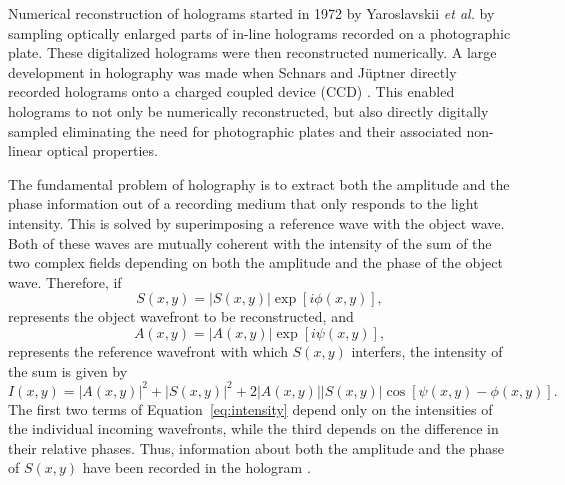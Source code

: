 Numerical reconstruction of holograms started in 1972 by Yaroslavskii
\emph{et al.} 
by sampling optically enlarged parts of in-line
holograms recorded on a photographic plate. These digitalized
holograms were then reconstructed numerically. A large development in
holography was made when Schnars and J\"{u}ptner directly recorded holograms
onto a charged coupled device (CCD) \cite{schnars_digital_2002}.
This enabled holograms to not only
be numerically reconstructed, but also directly digitally sampled
eliminating the need for
photographic plates and their associated non-linear optical properties.

The fundamental problem of holography is 
to extract
both the amplitude and the phase information out of
a recording medium that only responds to the light intensity. 
This is solved by superimposing a reference wave with the object wave. Both of
these waves are mutually coherent with the intensity of the sum of the two
complex fields depending on both the amplitude and the phase of the object
wave. Therefore, if
\begin{equation}
    S(x,y) = \left| S(x,y) \right | \exp{[i\phi(x,y)]} ,
\end{equation}
represents the object wavefront to be reconstructed, and
\begin{equation}
    A(x,y) = \left| A(x,y) \right | \exp{[i\psi(x,y)]} ,
\end{equation}
represents the reference wavefront with which $S(x,y)$ interfers, the intensity
of the sum is given by
\begin{equation}
    I(x,y) = \left| A(x,y) \right |^2 + \left| S(x,y) \right |^2 + 2\left|
    A(x,y) \right |\left| S(x,y) \right |\cos{\left[ \psi(x,y)-\phi(x,y)
    \right]} .
    \label{eq:intensity}
\end{equation}
The first two terms of Equation~\ref{eq:intensity} depend only on the
intensities of the individual incoming wavefronts, while the third depends on
the difference in their relative phases. Thus, information about both the amplitude and the phase
of $S(x,y)$ have been recorded in the hologram \cite{Goodman}.

